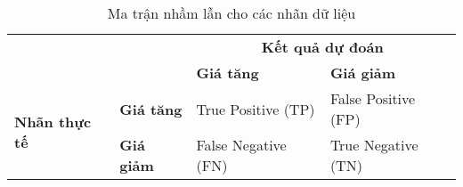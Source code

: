 \narrowlinespacing

\begin{table}[H] 
    \centering

    \begin{tabularx}{0.9\textwidth}{
    p{}%
    p{}%
    p{}
    p{}
    }
        
        \toprule\midrule
        \textbf{} & \textbf{} & \multicolumn{2}{c}{\textbf{Kết quả dự đoán}} \\
        \cmidrule(rl){3-4}
        \textbf{} & \textbf{} & \textbf{Giá tăng} & \textbf{Giá giảm} \\
        \midrule
        \multirow{2}{*}{\textbf{Nhãn thực tế }}  & \textbf{Giá tăng} & True Positive (TP) & 
        False Positive (FP)\\
        & \textbf{Giá giảm} & False Negative (FN) & True Negative (TN) \\
        \midrule
        \bottomrule
        
    \end{tabularx}
    \label{tab:confusion_matrix}
    \caption{Ma trận nhầm lẫn  cho các nhãn dữ liệu}
\end{table}

\normallinespacing
